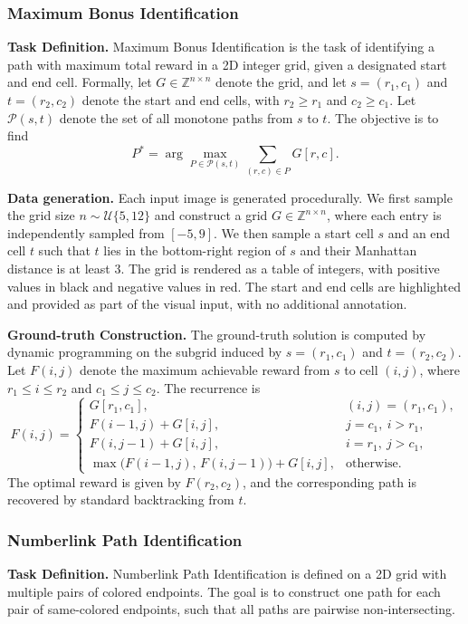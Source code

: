 \documentclass{llmxive}
\begin{document}
\subsubsection{Maximum Bonus Identification }
\textbf{Task Definition.}
Maximum Bonus Identification is the task of identifying a path with
maximum total reward in a 2D integer grid, given a designated start and end
cell. Formally, let \(G \in \mathbb{Z}^{n \times n}\) denote the grid, and let
\(s = (r_1, c_1)\) and \(t = (r_2, c_2)\) denote the start and end cells,
with \(r_2 \ge r_1\) and \(c_2 \ge c_1\). Let \(\mathcal{P}(s,t)\) denote the
set of all monotone paths from \(s\) to \(t\). The objective is to find
\begin{equation}
P^* = \arg\max_{P \in \mathcal{P}(s,t)} \sum_{(r,c)\in P} G[r,c].
\end{equation}

\textbf{Data generation.}
Each input image is generated procedurally. We first sample the grid size
\(n \sim \mathcal{U}\{5,12\}\) and construct a grid
\(G \in \mathbb{Z}^{n \times n}\), where each entry is independently sampled
from \([-5,9]\). We then sample a start cell \(s\) and an end cell \(t\) such
that \(t\) lies in the bottom-right region of \(s\) and their Manhattan
distance is at least 3. The grid is rendered as a table of integers, with positive values in black and
negative values in red. The start and end cells are highlighted and provided
as part of the visual input, with no additional annotation.

\textbf{Ground-truth Construction.}
The ground-truth solution is computed by dynamic programming on the subgrid
induced by \(s=(r_1,c_1)\) and \(t=(r_2,c_2)\). Let
\(F(i,j)\) denote the maximum achievable reward from \(s\) to cell \((i,j)\),
where \(r_1 \le i \le r_2\) and \(c_1 \le j \le c_2\). The recurrence is
\begin{equation}
F(i,j)=
\begin{cases}
G[r_1,c_1], & (i,j)=(r_1,c_1),\\[4pt]
F(i-1,j)+G[i,j], & j=c_1,\ i>r_1,\\[4pt]
F(i,j-1)+G[i,j], & i=r_1,\ j>c_1,\\[4pt]
\max\bigl(F(i-1,j),\,F(i,j-1)\bigr)+G[i,j], & \text{otherwise}.
\end{cases}
\end{equation}
The optimal reward is given by \(F(r_2,c_2)\), and the corresponding path is
recovered by standard backtracking from \(t\).

\subsubsection{Numberlink Path Identification}
\textbf{Task Definition.}
Numberlink Path Identification is defined on a 2D grid with multiple pairs of
colored endpoints. The goal is to construct one path for each pair of
same-colored endpoints, such that all paths are pairwise non-intersecting.
\end{document}
